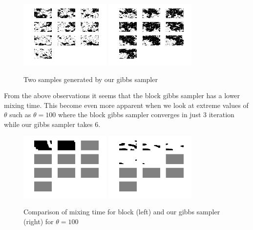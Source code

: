 \documentclass[10pt,onecolumn,letterpaper]{article}
\begin{document}
\begin{figure}[htbp]
  \centering
    \includegraphics[width=0.4\textwidth]{Images/gibbs_sampler_1.png}
    \hfill
	\includegraphics[width=0.4\textwidth]{Images/gibbs_sampler_2.png}
    \caption{Two samples generated by our gibbs sampler} 
\end{figure}

From the above observations it seems that the block gibbs sampler has a lower mixing time. This become even more apparent when we look at extreme values of $\theta$ such as $\theta=100$ where the block gibbs sampler converges in just 3 iteration while our gibbs sampler takes 6.

\begin{figure}[htbp]
  \centering
    \includegraphics[width=0.4\textwidth]{Images/block_theta_100.png}
    \hfill
	\includegraphics[width=0.4\textwidth]{Images/gibbs_sampler_theta_100.png}
    \caption{Comparison of mixing time for block (left) and our gibbs sampler (right) for $\theta=100$} 
\end{figure}
\end{document}
